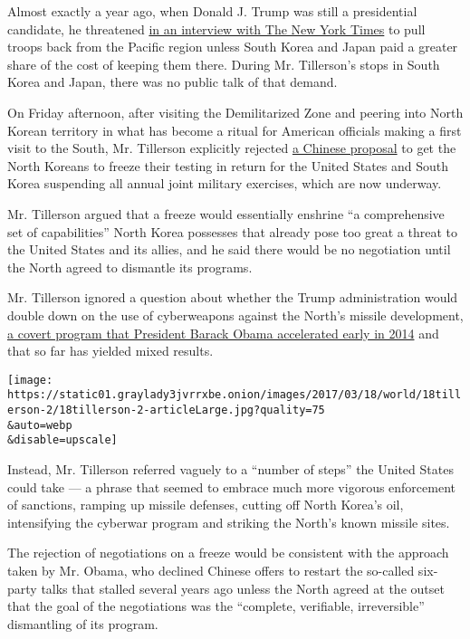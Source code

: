 Almost exactly a year ago, when Donald J. Trump was still a presidential
candidate, he threatened
\href{https://www.nytimes3xbfgragh.onion/2016/03/27/us/politics/donald-trump-foreign-policy.html}{in
an interview with The New York Times} to pull troops back from the
Pacific region unless South Korea and Japan paid a greater share of the
cost of keeping them there. During Mr. Tillerson's stops in South Korea
and Japan, there was no public talk of that demand.

On Friday afternoon, after visiting the Demilitarized Zone and peering
into North Korean territory in what has become a ritual for American
officials making a first visit to the South, Mr. Tillerson explicitly
rejected
\href{https://www.nytimes3xbfgragh.onion/2017/03/08/world/asia/china-north-korea-thaad-nuclear.html}{a
Chinese proposal} to get the North Koreans to freeze their testing in
return for the United States and South Korea suspending all annual joint
military exercises, which are now underway.

Mr. Tillerson argued that a freeze would essentially enshrine ``a
comprehensive set of capabilities'' North Korea possesses that already
pose too great a threat to the United States and its allies, and he said
there would be no negotiation until the North agreed to dismantle its
programs.

Mr. Tillerson ignored a question about whether the Trump administration
would double down on the use of cyberweapons against the North's missile
development,
\href{https://www.nytimes3xbfgragh.onion/2017/03/04/world/asia/north-korea-missile-program-sabotage.html}{a
covert program that President Barack Obama accelerated early in 2014}
and that so far has yielded mixed results.

\texttt{[image: https://static01.graylady3jvrrxbe.onion/images/2017/03/18/world/18tillerson-2/18tillerson-2-articleLarge.jpg?quality=75\\\&auto=webp\\\&disable=upscale]}

Instead, Mr. Tillerson referred vaguely to a ``number of steps'' the
United States could take --- a phrase that seemed to embrace much more
vigorous enforcement of sanctions, ramping up missile defenses, cutting
off North Korea's oil, intensifying the cyberwar program and striking
the North's known missile sites.

The rejection of negotiations on a freeze would be consistent with the
approach taken by Mr. Obama, who declined Chinese offers to restart the
so-called six-party talks that stalled several years ago unless the
North agreed at the outset that the goal of the negotiations was the
``complete, verifiable, irreversible'' dismantling of its program.

